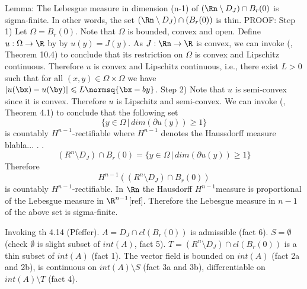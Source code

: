 Lemma: The Lebesgue measure in dimension (n-1) of $(\Rn\setminus D_J) \cap B_r(0)$ is sigma-finite.
In other words, the set $(\Rn \setminus D_J) \cap (B_r(0))$ is thin.
PROOF: 
Step 1) Let $\Omega = B_r(0)$. Note that $\Omega$ is bounded, convex and open.  Define $u : \Omega \to \R$ by by $u(y) = J(y)$.
As $J: \Rn \to \R$ is convex, we can invoke (\cite{rockafellar1970convex}, Theorem 10.4) to conclude that its restriction on $\Omega$ is convex and Lipschitz continuous. Therefore $u$ is convex and Lipschitz continuous, i.e., there exist $L>0$ such that for all $(x,y) \in \Omega \times \Omega$ we have $|u(\bx)-u(\by)| \leqslant L\normsq{\bx-by}$.
Step 2) %
Note that $u$ is semi-convex since it is convex. Therefore $u$ is Lipschitz and semi-convex. We can invoke (\cite{alberti1992singularities}, Theorem 4.1) to conclude that the following set
$$
\{
y \in \Omega \,|\, dim(\partial u(y)) \geq 1 
\}
$$
is countably $H^{n-1}$-rectifiable where $H^{n-1}$ denotes the Haussdorff measure blabla... . 
. 
$$
(R^n \setminus D_J) \cap B_r(0) =
\{
y \in \Omega \,|\, dim(\partial u(y)) \geq 1 
\}
$$
Therefore 
$$
H^{n-1}((R^n \setminus D_J) \cap B_r(0))
$$
is countably $H^{n-1}$-rectifiable. 
In $\Rn$ the Hausdorff $H^{n-1} $measure is proportional of the Lebesgue measure in $\R^{n-1}$[ref].
%
Therefore the Lebesgue measure in $n-1$ of the above set is sigma-finite. 



Invoking th 4.14 (Pfeffer). $A = D_J \cap cl (B_r(0))$ is admissible (fact 6). 
$S = \emptyset$ (check $\emptyset$ is slight subset of $int(A)$, fact 5). $T = (R^n \setminus D_J) \cap cl (B_r(0))$ is a thin subset of $int(A)$ (fact 1).
The vector field  is bounded on $int(A)$ (fact 2a and 2b), is continuous on $int(A) \setminus S$ (fact 3a and 3b), differentiable on $int(A)\setminus T$ (fact 4). 


